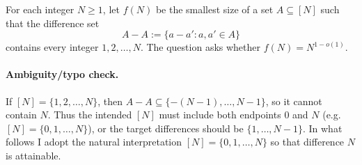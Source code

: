 For each integer $N\ge 1$, let $f(N)$ be the smallest size of a set $A\subseteq [N]$ such that the difference set
\[
A-A:=\{a-a':a,a'\in A\}
\]
contains every integer $1,2,\dots,N$.
The question asks whether $f(N)=N^{1-o(1)}$.

\paragraph{Ambiguity/typo check.}
If $[N]=\{1,2,\dots,N\}$, then $A-A\subseteq\{-(N-1),\dots,N-1\}$, so it cannot contain $N$.
Thus the intended $[N]$ must include both endpoints $0$ and $N$ (e.g. $[N]=\{0,1,\dots,N\}$), or the target differences should be $\{1,\dots,N-1\}$.
In what follows I adopt the natural interpretation $[N]=\{0,1,\dots,N\}$ so that difference $N$ is attainable.

